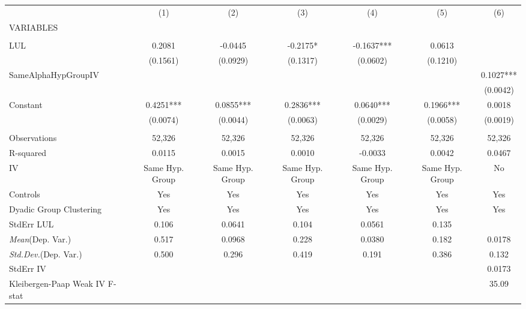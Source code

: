 \documentclass[]{article}
\begin{document}
\begin{tabular}{lcccccc} \hline
 & (1) & (2) & (3) & (4) & (5) & (6) \\
VARIABLES &  &  &  &  &  &  \\ \hline
 &  &  &  &  &  &  \\
LUL & 0.2081 & -0.0445 & -0.2175* & -0.1637*** & 0.0613 &  \\
 & (0.1561) & (0.0929) & (0.1317) & (0.0602) & (0.1210) &  \\
SameAlphaHypGroupIV &  &  &  &  &  & 0.1027*** \\
 &  &  &  &  &  & (0.0042) \\
Constant & 0.4251*** & 0.0855*** & 0.2836*** & 0.0640*** & 0.1966*** & 0.0018 \\
 & (0.0074) & (0.0044) & (0.0063) & (0.0029) & (0.0058) & (0.0019) \\
 &  &  &  &  &  &  \\
Observations & 52,326 & 52,326 & 52,326 & 52,326 & 52,326 & 52,326 \\
R-squared & 0.0115 & 0.0015 & 0.0010 & -0.0033 & 0.0042 & 0.0467 \\
IV & Same Hyp. Group & Same Hyp. Group & Same Hyp. Group & Same Hyp. Group & Same Hyp. Group & No \\
Controls & Yes & Yes & Yes & Yes & Yes & Yes \\
Dyadic Group Clustering & Yes & Yes & Yes & Yes & Yes & Yes \\
StdErr LUL & 0.106 & 0.0641 & 0.104 & 0.0561 & 0.135 &  \\
\textit{Mean}(Dep. Var.) & 0.517 & 0.0968 & 0.228 & 0.0380 & 0.182 & 0.0178 \\
\textit{Std.Dev.}(Dep. Var.) & 0.500 & 0.296 & 0.419 & 0.191 & 0.386 & 0.132 \\
StdErr IV &  &  &  &  &  & 0.0173 \\
 Kleibergen-Paap Weak IV F-stat &  &  &  &  &  & 35.09 \\ \hline
\end{tabular}
\end{document}

